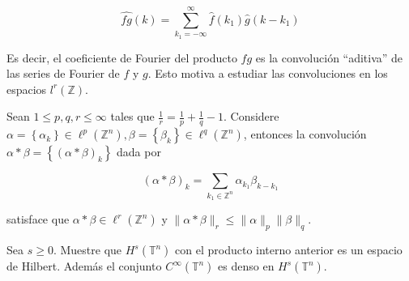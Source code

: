 \documentclass[12pt]{article}
\newcommand\T{\mathbb{T}}
\begin{document}
$$
\widehat{f g}(k)=\sum_{k_1=-\infty}^{\infty} \widehat{f}\left(k_1\right) \widehat{g}\left(k-k_1\right)
$$


Es decir, el coeficiente de Fourier del producto $f g$ es la convolución ``aditiva'' de las series de Fourier de $f$ y $g$. Esto motiva a estudiar las convoluciones en los espacios $l^r(\mathbb{Z})$.

\begin{theorem}
Sean $1 \leq p, q, r \leq \infty$ tales que $\frac{1}{r}=\frac{1}{p}+\frac{1}{q}-1$. Considere $\alpha=\left\{\alpha_k\right\} \in \ell^p\left(\mathbb{Z}^n\right), \beta=\left\{\beta_k\right\} \in \ell^q\left(\mathbb{Z}^n\right)$, entonces la convolución $\alpha * \beta=\left\{(\alpha * \beta)_k\right\}$ dada por

$$
(\alpha * \beta)_k=\sum_{k_1 \in \mathbb{Z}^n} \alpha_{k_1} \beta_{k-k_1}
$$

satisface que $\alpha * \beta \in \ell^r\left(\mathbb{Z}^n\right)$ y $\|\alpha * \beta\|_r \leq\|\alpha\|_{p}\|\beta\|_{q}$.

\end{theorem}


\begin{theorem}
Sea $s \geq 0$. Muestre que $H^s\left(\mathbb{T}^n\right)$ con el producto interno anterior es un espacio de Hilbert. Además el conjunto $C^{\infty}(\T^n)$ es denso en $H^s(\T^n)$.
\end{theorem}
\end{document}

